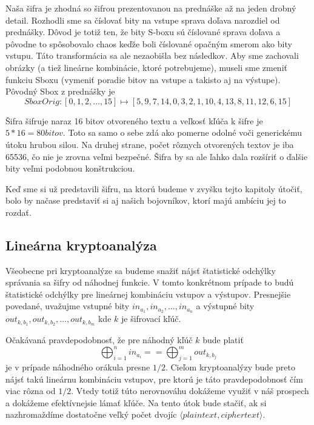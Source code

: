 \begin{poznamka}
    Naša šifra je zhodná so šifrou prezentovanou na prednáške až na
    jeden drobný detail. Rozhodli sme sa číslovať bity na vstupe
    sprava doľava narozdiel od prednášky. Dôvod je totiž ten, že bity
    S-boxu sú číslované sprava doľava a pôvodne to spôsobovalo chaos
    keďže boli číslované opačným smerom ako bity vstupu. Táto
    transformácia sa ale nezaobišla bez následkov. Aby sme zachovali
    obrázky (a tiež lineárne kombinácie, ktoré potrebujeme), museli
    sme zmeniť funkciu Sboxu (vymeniť poradie bitov na vstupe a
    takisto aj na výstupe).
    Pôvodný Sbox z prednášky je
    \begin{equation*}
    SboxOrig:[0,1,2,\dots,15] \mapsto
    [5, 9, 7, 14, 0, 3, 2, 1, 10, 4, 13, 8, 11, 12, 6, 15]
    \end{equation*}
\end{poznamka}

Šifra šifruje naraz 16 bitov otvoreného textu a 
veľkosť kľúča k šifre je $5*16=80\unit{bitov}$.
Toto sa samo o sebe zdá ako pomerne odolné voči generickému útoku
hrubou silou. Na druhej strane, počet rôznych otvorených textov je iba
65536, čo nie je zrovna veľmi bezpečné. Šifra by sa ale ľahko dala
rozšíriť o ďalšie bity veľmi podobnou konštrukciou.

Keď sme si už predstavili šifru, na ktorú budeme v zvyšku tejto
kapitoly útočiť, bolo by načase predstaviť si aj našich bojovníkov,
ktorí majú ambíciu jej to rozdať.

\subsection{Lineárna kryptoanalýza}

Všeobecne pri kryptoanalýze sa budeme snažiť nájsť štatistické odchýlky
správania sa šifry od náhodnej funkcie.
V tomto konkrétnom prípade to budú štatistické odchýlky
pre lineárnej kombináciu vstupov a výstupov.
Presnejšie povedané, uvažujme vstupné bity
$in_{a_1},in_{a_2},\dots,in_{a_n}$ a výstupné bity
$out_{k,b_1},out_{k,b_2},\dots,out_{k,b_m}$ kde $k$ je šifrovací kľúč.

Očakávaná pravdepodobnosť, že pre náhodný kľúč $k$ bude platiť
\begin{equation}
    \label{eq:lin_approx}
    \bigoplus_{i=1}^n in_{a_i} == \bigoplus_{j=1}^{m} out_{k,b_j}
\end{equation}
je v prípade náhodného orákula presne $1/2$. Cieľom kryptoanalýzy bude
preto nájsť takú lineárnu kombináciu vstupov, pre ktorú je táto
pravdepodobnosť čím viac rôzna od $1/2$. Vtedy totiž túto nerovnováhu
dokážeme využiť v náš prospech a dokážeme efektívnejsie lámať kľúče.
Na tento útok bude stačiť, ak si nazhromaždíme dostatočne veľký počet
dvojíc $\langle plaintext, ciphertext \rangle$.

